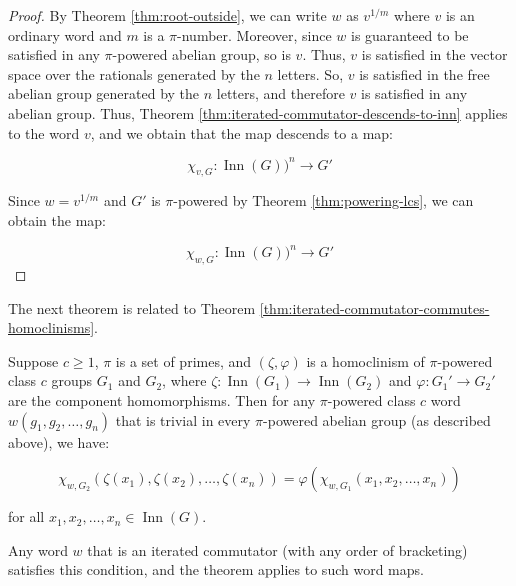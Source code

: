 \begin{proof}
  By Theorem \ref{thm:root-outside}, we can write $w$ as $v^{1/m}$
  where $v$ is an ordinary word and $m$ is a $\pi$-number. Moreover,
  since $w$ is guaranteed to be satisfied in any $\pi$-powered abelian
  group, so is $v$. Thus, $v$ is satisfied in the vector space over
  the rationals generated by the $n$ letters. So, $v$ is satisfied in
  the free abelian group generated by the $n$ letters, and therefore
  $v$ is satisfied in any abelian group. Thus, Theorem
  \ref{thm:iterated-commutator-descends-to-inn} applies to the word
  $v$, and we obtain that the map descends to a map:

  $$\chi_{v,G}: \operatorname{Inn}(G))^n \to G'$$

  Since $w = v^{1/m}$ and $G'$ is $\pi$-powered by Theorem
  \ref{thm:powering-lcs}, we can obtain the map:

  $$\chi_{w,G}: \operatorname{Inn}(G))^n \to G'$$
\end{proof}

The next theorem is related to Theorem \ref{thm:iterated-commutator-commutes-homoclinisms}.

\begin{theorem}\label{thm:iterated-commutator-commutes-homoclinisms-pi-powered}
  Suppose $c \ge 1$, $\pi$ is a set of primes, and $(\zeta,\varphi)$
  is a homoclinism of $\pi$-powered class $c$ groups $G_1$ and $G_2$,
  where $\zeta:\operatorname{Inn}(G_1) \to \operatorname{Inn}(G_2)$
  and $\varphi:G_1' \to G_2'$ are the component homomorphisms. Then
  for any $\pi$-powered class $c$ word $w(g_1,g_2,\dots,g_n)$ that is
  trivial in every $\pi$-powered abelian group (as described above),
  we have:

  $$\chi_{w,G_2}(\zeta(x_1),\zeta(x_2),\dots,\zeta(x_n)) = \varphi(\chi_{w,G_1}(x_1,x_2,\dots,x_n))$$

  for all $x_1,x_2,\dots,x_n \in \operatorname{Inn}(G)$.

  Any word $w$ that is an iterated commutator (with any order of
  bracketing) satisfies this condition, and the theorem applies to
  such word maps.
\end{theorem}

